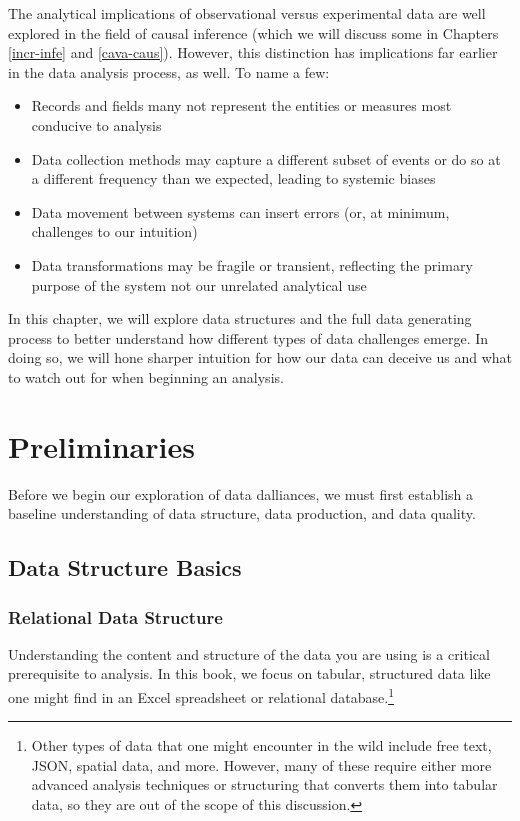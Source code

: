 \documentclass[
]{krantz}
\providecommand{\tightlist}{%
  \setlength{\itemsep}{0pt}\setlength{\parskip}{0pt}}
\begin{document}
The analytical implications of observational versus experimental data are well explored in the field of causal inference (which we will discuss some in Chapters \ref{incr-infe} and \ref{cava-caus}).
However, this distinction has implications far earlier in the data analysis process, as well.
To name a few:

\begin{itemize}
\tightlist
\item
  Records and fields many not represent the entities or measures most conducive to analysis
\item
  Data collection methods may capture a different subset of events or do so at a different frequency than we expected, leading to systemic biases
\item
  Data movement between systems can insert errors (or, at minimum, challenges to our intuition)
\item
  Data transformations may be fragile or transient, reflecting the primary purpose of the system not our unrelated analytical use
\end{itemize}

In this chapter, we will explore data structures and the full data generating process to better understand how different types of data challenges emerge.
In doing so, we will hone sharper intuition for how our data can deceive us and what to watch out for when beginning an analysis.

\hypertarget{preliminaries}{%
\section{Preliminaries}\label{preliminaries}}

Before we begin our exploration of data dalliances, we must first establish a baseline understanding of data structure, data production, and data quality.

\hypertarget{data-structure-basics}{%
\subsection{Data Structure Basics}\label{data-structure-basics}}

\hypertarget{relational-data-structure}{%
\subsubsection{Relational Data Structure}\label{relational-data-structure}}

Understanding the content and structure of the data you are using is a critical prerequisite to analysis.
In this book, we focus on tabular, structured data like one might find in an Excel spreadsheet or relational database.\footnote{Other types of data that one might encounter in the wild include free text, JSON, spatial data, and more. However, many of these require either more advanced analysis techniques or structuring that converts them into tabular data, so they are out of the scope of this discussion.}
\end{document}
